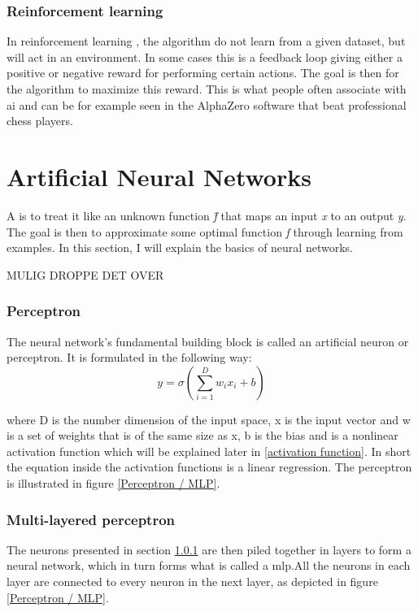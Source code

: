        \subsubsection{Reinforcement learning}
            In reinforcement learning \cite{Goodfellow-et-al-2016_E}, the algorithm do not learn from a given dataset, but will act in an environment. In some cases this is a feedback loop giving either a positive or negative reward for performing certain actions. The goal is then for the algorithm to maximize this reward. This is what people often associate with \gls{ai} and can be for example seen in the AlphaZero software that beat professional chess players\cite{silver2017mastering}.
                

\section{Artificial Neural Networks} \label{neural networks}
    A \glsadd{} \cite{Goodfellow-et-al-2016_NN} is to treat it like an unknown function \textit{\^{f}} that maps an input \textit{x} to an output \textit{y}. The goal is then to approximate some optimal function \textit{f} through learning from examples. In this section, I will explain the basics of neural networks.
    
    MULIG DROPPE DET OVER
    
    \subsubsection{Perceptron} \label{perceptron}
        The neural network's fundamental building block is called an artificial neuron or perceptron. It is formulated in the following way\cite{razavi2021deep_exp_per}:
            \begin{equation} \label{eq_perceptron}
                y = \sigma(\sum_{i=1}^{D}w_ix_i + b)
            \end{equation}
            
        where D is the number dimension of the input space, x is the input vector and w is a set of weights that is of the same size as x, b is the bias and {\textsigma} is a nonlinear activation function which will be explained later in \ref{activation function}. In short the equation inside the activation functions is a linear regression. The perceptron is illustrated in figure \ref{Perceptron / MLP}.
    
    \subsubsection{Multi-layered perceptron} \label{MLP}
        The neurons presented in section \ref{perceptron} are then piled together in layers to form a neural network, which in turn forms what is called a \gls{mlp}.All the neurons in each layer are connected to every neuron in the next layer, as depicted in figure \ref{Perceptron / MLP}.
        
